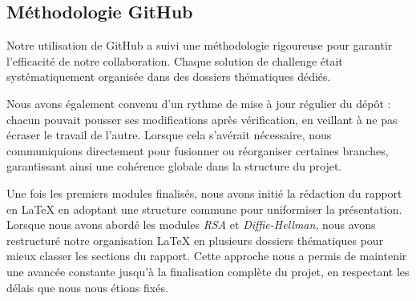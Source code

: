 \subsection{Méthodologie GitHub}
Notre utilisation de GitHub a suivi une méthodologie rigoureuse pour garantir l'efficacité de notre collaboration. Chaque solution de challenge était systématiquement organisée dans des dossiers thématiques dédiés. 

Nous avons également convenu d’un rythme de mise à jour régulier du dépôt :
chacun pouvait pousser ses modifications après vérification, en veillant à
ne pas écraser le travail de l’autre. Lorsque cela s’avérait nécessaire,
nous communiquions directement pour fusionner ou réorganiser certaines
branches, garantissant ainsi une cohérence globale dans la structure du
projet.

Une fois les premiers modules finalisés, nous avons initié la rédaction du rapport en \LaTeX{} en adoptant une structure commune pour uniformiser la présentation.  Lorsque nous avons abordé les modules \textit{RSA} et \textit{Diffie-Hellman}, nous avons restructuré notre organisation \LaTeX{} en plusieurs dossiers thématiques pour mieux classer les sections du rapport. Cette approche nous a permis de maintenir une avancée constante jusqu'à la finalisation complète du projet, en respectant les délais que nous nous étions fixés.